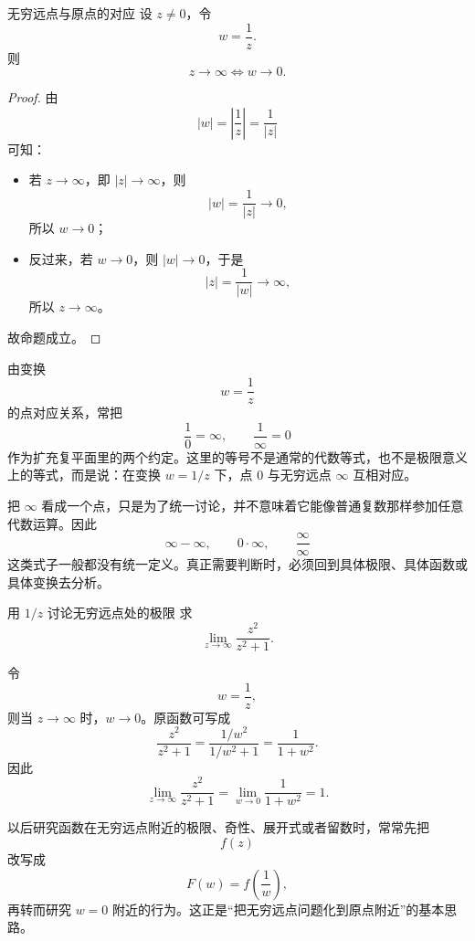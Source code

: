 \begin{dingli}{无穷远点与原点的对应}{}
设 $z\neq 0$，令
\[
w=\frac{1}{z}.
\]
则
\begin{equation}
    z\to \infty \Longleftrightarrow w\to 0.
\end{equation}
\end{dingli}

\begin{proof}
由
\[
|w|=\left|\frac{1}{z}\right|=\frac{1}{|z|}
\]
可知：
\begin{itemize}
    \item 若 $z\to\infty$，即 $|z|\to\infty$，则
    \[
    |w|=\frac{1}{|z|}\to 0,
    \]
    所以 $w\to 0$；
    \item 反过来，若 $w\to 0$，则 $|w|\to 0$，于是
    \[
    |z|=\frac{1}{|w|}\to \infty,
    \]
    所以 $z\to\infty$。
\end{itemize}
故命题成立。
\end{proof}

\begin{tishi}[扩充复平面里的两个常用约定]
由变换
\[
w=\frac{1}{z}
\]
的点对应关系，常把
\[
\frac{1}{0}=\infty,\qquad \frac{1}{\infty}=0
\]
作为扩充复平面里的两个约定。这里的等号不是通常的代数等式，也不是极限意义上的等式，而是说：在变换 $w=1/z$ 下，点 $0$ 与无穷远点 $\infty$ 互相对应。
\end{tishi}

\begin{zhu}{}{}
把 $\infty$ 看成一个点，只是为了统一讨论，并不意味着它能像普通复数那样参加任意代数运算。因此
\[
\infty-\infty,\qquad 0\cdot\infty,\qquad \frac{\infty}{\infty}
\]
这类式子一般都没有统一定义。真正需要判断时，必须回到具体极限、具体函数或具体变换去分析。
\end{zhu}

\begin{lizi}{用 $1/z$ 讨论无穷远点处的极限}{}
求
\[
\lim_{z\to\infty}\frac{z^2}{z^2+1}.
\]

\begin{jie}
令
\[
w=\frac{1}{z},
\]
则当 $z\to\infty$ 时，$w\to 0$。原函数可写成
\[
\frac{z^2}{z^2+1}
=\frac{1/w^2}{1/w^2+1}
=\frac{1}{1+w^2}.
\]
因此
\[
\lim_{z\to\infty}\frac{z^2}{z^2+1}
=\lim_{w\to 0}\frac{1}{1+w^2}=1.
\]
\end{jie}
\end{lizi}

\begin{tishi}
以后研究函数在无穷远点附近的极限、奇性、展开式或者留数时，常常先把
\[
f(z)
\]
改写成
\[
F(w)=f\!\left(\frac{1}{w}\right),
\]
再转而研究 $w=0$ 附近的行为。这正是``把无穷远点问题化到原点附近''的基本思路。
\end{tishi}

